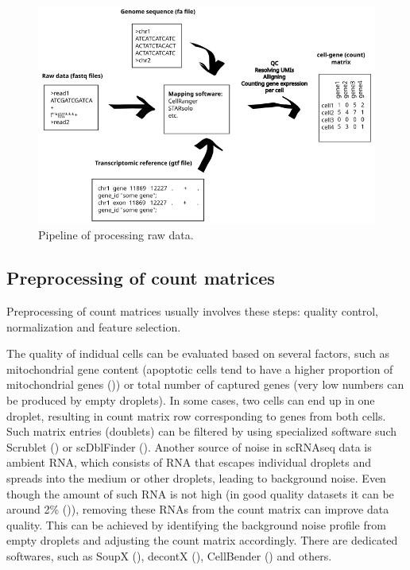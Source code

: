 \begin{figure}
  \centering
  \includegraphics[width=\linewidth]{images/rawdata.png}
  \caption{Pipeline of processing raw data.}
  \label{fig:rawData}
\end{figure}

\subsection{Preprocessing of count matrices}

Preprocessing of count matrices usually involves these steps:
quality control, normalization and feature selection.

The quality of indidual cells can be evaluated based on several factors, such as mitochondrial gene content
(apoptotic cells tend to have a higher proportion of mitochondrial genes (\cite{Heumos2023})) or
total number of captured genes (very low numbers can be produced by empty droplets).
In some cases, two cells can end up in one droplet,
resulting in count matrix row corresponding to genes from  both cells.
Such matrix entries (doublets) can be filtered by using specialized software
such Scrublet (\cite{Wolock2019}) or scDblFinder (\cite{Germain2022}).
Another source of noise in scRNAseq data is ambient RNA,
which consists of RNA that escapes individual droplets and spreads into the medium or other droplets,
leading to background noise.
Even though the amount of such RNA is not high (in good quality datasets it can be around 2\% (\cite{Young2020})),
removing these RNAs from the count matrix can improve data quality.
This can be achieved by identifying the background noise profile from empty droplets and
adjusting the count matrix accordingly.
There are dedicated softwares,
such as SoupX (\cite{Young2020}), decontX (\cite{Yang2020}), CellBender (\cite{Fleming2023}) and others.


